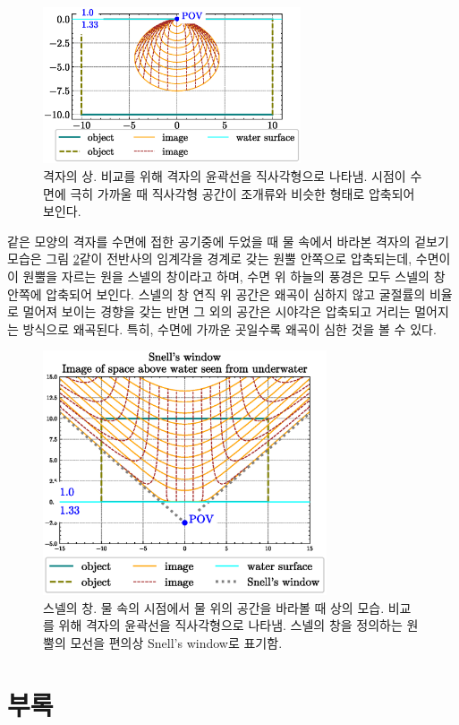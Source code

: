 \documentclass[twocolumn]{article}
\begin{document}
\begin{figure}
	\centering
	\includegraphics[width=3in]{figs/seashell_shape.eps}
	\caption{격자의 상.  비교를 위해 격자의 윤곽선을 직사각형으로 나타냄. 시점이 수면에 극히 가까울 때 직사각형 공간이 조개류와 비슷한 형태로 압축되어 보인다.}
	\label{fig:seashell}
\end{figure}

같은 모양의 격자를 수면에 접한 공기중에 두었을 때 물 속에서 바라본 격자의 겉보기 모습은 그림 \ref{fig:snell_window}\과 같이 전반사의 임계각을 경계로 갖는 원뿔 안쪽으로 압축되는데, 수면이 이 원뿔을 자르는 원을 스넬의 창이라고 하며, 수면 위 하늘의 풍경은 모두 스넬의 창 안쪽에 압축되어 보인다. 스넬의 창 연직 위 공간은 왜곡이 심하지 않고 굴절률의 비율로 멀어져 보이는 경향을 갖는 반면 그 외의 공간은 시야각은 압축되고 거리는 멀어지는 방식으로 왜곡된다. 특히, 수면에 가까운 곳일수록 왜곡이 심한 것을 볼 수 있다.

\begin{figure}
	\centering
	\includegraphics[width=3.3in]{figs/snell_window.eps}
	\caption{스넬의 창. 물 속의 시점에서 물 위의 공간을 바라볼 때 상의 모습. 비교를 위해 격자의 윤곽선을 직사각형으로 나타냄. 스넬의 창을 정의하는 원뿔의 모선을 편의상 Snell's window로 표기함.}
	\label{fig:snell_window}
\end{figure}

\appendix
\section*{부록}
\newcommand{\pd}[2]{{\frac{\partial #1}{\partial #2}}}
\newcommand{\ilpd}[2]{{{\partial #1}/{\partial #2}}}
\end{document}
